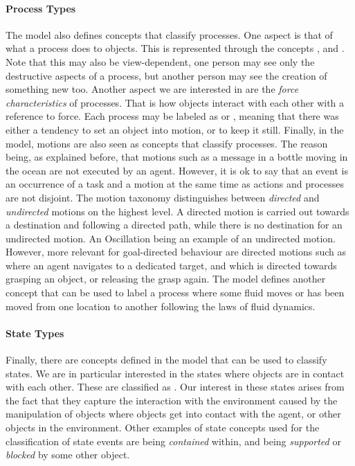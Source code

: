 \paragraph{Process Types}
The \neem model also defines concepts that classify processes.
One aspect is that of what a process does to objects.
This is represented through the concepts ,  and .
Note that this may also be view-dependent, one person may see only the destructive aspects of a process, but another person may see the creation of something new too.
Another aspect we are interested in are the \emph{force characteristics} of processes.
That is how objects interact with each other with a reference to force.
Each process may be labeled as  or , meaning that there was either a tendency to set an object into motion, or to keep it still.
Finally, in the \neem model, motions are also seen as concepts that classify processes.
The reason being, as explained before, that motions such as a message in a bottle moving in the ocean are not executed by an agent.
However, it is ok to say that an event is an occurrence of a task and a motion at the same time as actions and processes are not disjoint.
The motion taxonomy distinguishes between \emph{directed} and \emph{undirected} motions on the highest level.
A directed motion is carried out towards a destination and following a directed path, while there is no destination for an undirected motion.
An Oscillation being an example of an undirected motion.
However, more relevant for goal-directed behaviour are directed motions such as  where an agent navigates to a dedicated target, and  which is directed towards grasping an object, or releasing the grasp again.
The \neem model defines another concept  that can be used to label a process where some fluid moves or has been moved from one location to another following the laws of fluid dynamics.

\paragraph{State Types}
Finally, there are concepts defined in the \neem model that can be used to classify states.
We are in particular interested in the states where objects are in contact with each other.
These are classified as .
Our interest in these states arises from the fact that they capture the interaction with the environment caused by the manipulation of objects where objects get into contact with the agent, or other objects in the environment.
Other examples of state concepts used for the classification of state events are being \emph{contained} within, and being \emph{supported} or \emph{blocked} by some other object.


